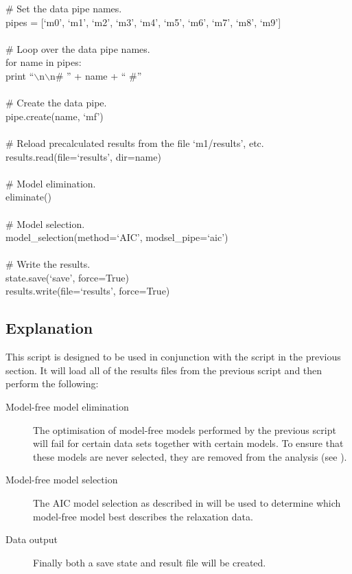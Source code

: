 \begin{htmlonly}
\begin{htmlonly}
\begin{exampleenv}
\# Set the data pipe names. \\
pipes = [`m0', `m1', `m2', `m3', `m4', `m5', `m6', `m7', `m8', `m9'] \\
 \\
\# Loop over the data pipe names. \\
for name in pipes: \\
\hspace*{4ex} print ``$\backslash$n$\backslash$n\# '' + name + `` \#'' \\
 \\
\hspace*{4ex} \# Create the data pipe. \\
\hspace*{4ex} pipe.create(name, `mf') \\
 \\
\hspace*{4ex} \# Reload precalculated results from the file `m1/results', etc. \\
\hspace*{4ex} results.read(file=`results', dir=name) \\
 \\
\# Model elimination. \\
eliminate() \\
 \\
\# Model selection. \\
model\_selection(method=`AIC', modsel\_pipe=`aic') \\
 \\
\# Write the results. \\
state.save(`save', force=True) \\
results.write(file=`results', force=True)
\end{exampleenv}



\subsection{Explanation}

This script is designed to be used in conjunction with the  script in the previous section.  It will load all of the results files from the previous script and then perform the following:

\begin{description}
\item[Model-free model elimination]  The optimisation of model-free models performed by the previous script will fail for certain data sets together with certain models.  To ensure that these models are never selected, they are removed from the analysis (see \citet{dAuvergneGooley06}).
\item[Model-free model selection]  The AIC model selection as described in \citet{dAuvergneGooley03} will be used to determine which model-free model best describes the relaxation data.
\item[Data output]  Finally both a save state and result file will be created.
\end{description}


\end{htmlonly}
\end{htmlonly}
